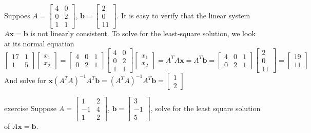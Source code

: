 \documentclass{beamer}
\theoremstyle{definition}
\theoremstyle{remark}
\begin{document}
\begin{frame}[t]
\begin{example}
Suppoes $A=\begin{bmatrix}
4&0\\
0&2\\
1&1
\end{bmatrix}$, $\mathbf b=\begin{bmatrix}
2\\0\\11
\end{bmatrix}$. It is easy to verify that the linear system $A\mathbf x=\mathbf b$ is not linearly consistent. To solve for the least-square solution, we look at its normal equation
\[
\begin{bmatrix}
17&1\\1&5
\end{bmatrix}\begin{bmatrix}
x_1\\x_2
\end{bmatrix}=\begin{bmatrix}
4&0&1\\
0&2&1
\end{bmatrix}\begin{bmatrix}
4&0\\
0&2\\
1&1
\end{bmatrix}\begin{bmatrix}
x_1\\x_2
\end{bmatrix}=A^TA\mathbf x=A^T\mathbf b=\begin{bmatrix}
4&0&1\\
0&2&1
\end{bmatrix}\begin{bmatrix}
2\\0\\11
\end{bmatrix}=\begin{bmatrix}
19\\11
\end{bmatrix}
\]
And solve for $\mathbf x(A^TA)^{-1}A^T\mathbf b=(A^TA)^{-1}A^T\mathbf b=\begin{bmatrix}
1\\2
\end{bmatrix}$
\end{example}
\end{frame}

\begin{frame}[t]{exercise}
Suppose $A=\begin{bmatrix}
1&2\\
-1&4\\
1&2
\end{bmatrix}$, $\mathbf b=\begin{bmatrix}
3\\-1\\5
\end{bmatrix}$, solve for the least square solution of $A\mathbf x=\mathbf b$.
\end{frame}
\end{document}
